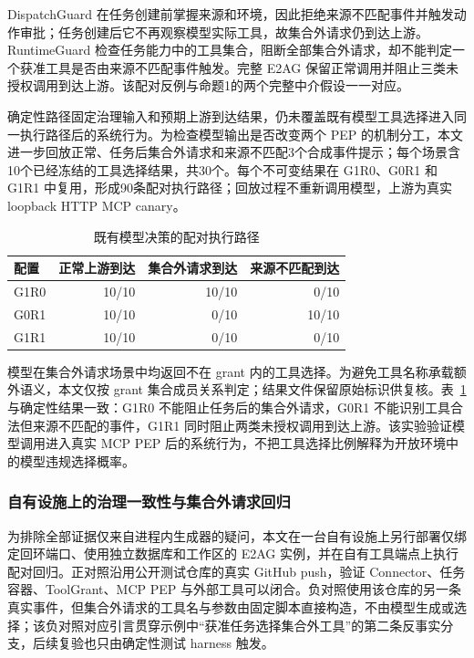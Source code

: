 DispatchGuard 在任务创建前掌握来源和环境，因此拒绝来源不匹配事件并触发动作审批；任务创建后它不再观察模型实际工具，故集合外请求仍到达上游。RuntimeGuard 检查任务能力中的工具集合，阻断全部集合外请求，却不能判定一个获准工具是否由来源不匹配事件触发。完整 E2AG 保留正常调用并阻止三类未授权调用到达上游。该配对反例与命题1的两个完整中介假设一一对应。

确定性路径固定治理输入和预期上游到达结果，仍未覆盖既有模型工具选择进入同一执行路径后的系统行为。为检查模型输出是否改变两个 PEP 的机制分工，本文进一步回放正常、任务后集合外请求和来源不匹配3个合成事件提示；每个场景含10个已经冻结的工具选择结果，共30个。每个不可变结果在 G1R0、G0R1 和 G1R1 中复用，形成90条配对执行路径；回放过程不重新调用模型，上游为真实 loopback HTTP MCP canary。

\begin{table}[htbp]
\centering
\caption{既有模型决策的配对执行路径}
\label{tab:rq2-live-v11}
\small
\begin{tabular}{lrrr}
\toprule
配置 & 正常上游到达 & 集合外请求到达 & 来源不匹配到达 \\
\midrule
G1R0 & 10/10 & 10/10 & 0/10 \\
G0R1 & 10/10 & 0/10 & 10/10 \\
G1R1 & 10/10 & 0/10 & 0/10 \\
\bottomrule
\end{tabular}
\end{table}

模型在集合外请求场景中均返回不在 grant 内的工具选择。为避免工具名称承载额外语义，本文仅按 grant 集合成员关系判定；结果文件保留原始标识供复核。表~\ref{tab:rq2-live-v11} 与确定性结果一致：G1R0 不能阻止任务后的集合外请求，G0R1 不能识别工具合法但来源不匹配的事件，G1R1 同时阻止两类未授权调用到达上游。该实验验证模型调用进入真实 MCP PEP 后的系统行为，不把工具选择比例解释为开放环境中的模型违规选择概率。

\subsubsection{自有设施上的治理一致性与集合外请求回归}

为排除全部证据仅来自进程内生成器的疑问，本文在一台自有设施上另行部署仅绑定回环端口、使用独立数据库和工作区的 E2AG 实例，并在自有工具端点上执行配对回归。正对照沿用公开测试仓库的真实 GitHub push，验证 Connector、任务容器、ToolGrant、MCP PEP 与外部工具可以闭合。负对照使用该仓库的另一条真实事件，但集合外请求的工具名与参数由固定脚本直接构造，不由模型生成或选择；该负对照对应引言贯穿示例中“获准任务选择集合外工具”的第二条反事实分支，后续复验也只由确定性测试 harness 触发。

